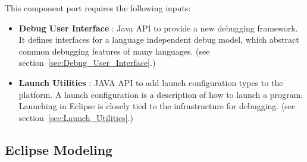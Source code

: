 \documentclass{gemoc} %
\begin{document}
This component port requires the following inputs:
\begin{itemize}
  \item \textbf{Debug User Interface} :
Java API to provide a new debugging framework. It defines interfaces for a language independent debug model, which abstract common debugging features of many languages. 
(see section~\ref{sec:Debug_User_Interface}.)
  \item \textbf{Launch Utilities} :
JAVA API to add launch configuration types to the platform. A launch configuration is a description of how to launch a program. Launching in Eclipse is closely tied to the infrastructure for debugging.
(see section~\ref{sec:Launch_Utilities}.)
\end{itemize}



\subsection{Eclipse Modeling}
\label{sec:Eclipse_Modeling}
\end{document}
